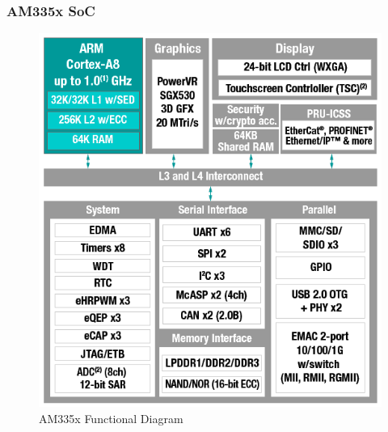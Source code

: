 \documentclass[aspectratio=169]{beamer}
\begin{document}
\begin{frame}
  \frametitle{AM335x SoC}
  \begin{figure}
    \centering
    \includegraphics[scale=0.4]{images/am335x.png}
    \caption{AM335x Functional Diagram}
  \end{figure}
  \vspace*{-12mm} %
\end{frame}
\end{document}
